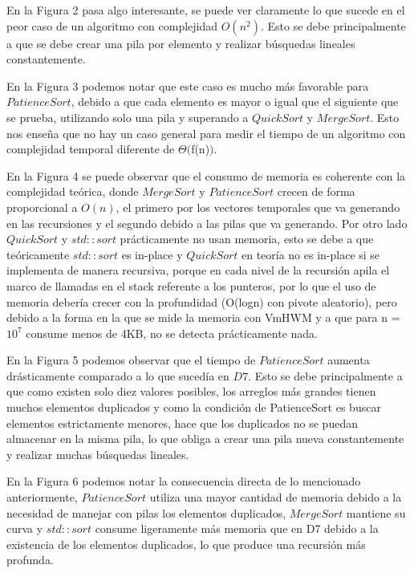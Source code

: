 En la Figura 2 pasa algo interesante, se puede ver claramente lo que sucede en el peor caso de un algoritmo con complejidad $O(n^2)$. Esto se debe principalmente a que se debe crear una pila por elemento y realizar búsquedas lineales constantemente.



En la Figura 3 podemos notar que este caso es mucho más favorable para $PatienceSort$, debido a que cada elemento es mayor o igual que el siguiente que se prueba, utilizando solo una pila y superando a $QuickSort$ y $MergeSort$. Esto nos enseña que no hay un caso general para medir el tiempo de un algoritmo con complejidad temporal diferente de $\Theta ($f(n)$)$.


En la Figura 4 se puede observar que el consumo de memoria es coherente con la complejidad teórica, donde $MergeSort$ y $PatienceSort$ crecen de forma
proporcional a $O(n)$, el primero por los vectores temporales que va generando en las recursiones y el segundo debido a las pilas que va generando. Por otro lado $QuickSort$ y $std::sort$ prácticamente no usan memoria, esto se debe a que teóricamente $std::sort$ es in-place y $QuickSort$ en teoría no es in-place si se implementa de manera recursiva, porque en cada nivel de la recursión apila el marco de llamadas en el stack referente a los punteros, por lo que el uso de memoria debería crecer con la profundidad (O(logn) con pivote aleatorio), pero debido a la forma en la que se mide la memoria con VmHWM y a que para n = $10^7$ consume menos de 4KB, no se detecta prácticamente nada.

En la Figura 5 podemos observar que el tiempo de $PatienceSort$ aumenta drásticamente comparado a lo que sucedía en $D7$. Esto se debe principalmente a que como existen solo diez valores posibles, los arreglos más grandes tienen muchos elementos duplicados y como la condición de PatienceSort es buscar elementos estrictamente menores, hace que los duplicados no se puedan almacenar en la misma pila, lo que obliga a crear una pila nueva constantemente y realizar muchas búsquedas lineales.



En la Figura 6 podemos notar la consecuencia directa de lo mencionado anteriormente, $PatienceSort$ utiliza una mayor cantidad de memoria debido a la necesidad de manejar con pilas los elementos duplicados, $MergeSort$ mantiene su curva y $std::sort$ consume ligeramente más memoria que en D7 debido a la existencia de los elementos duplicados, lo que produce una recursión más profunda.

